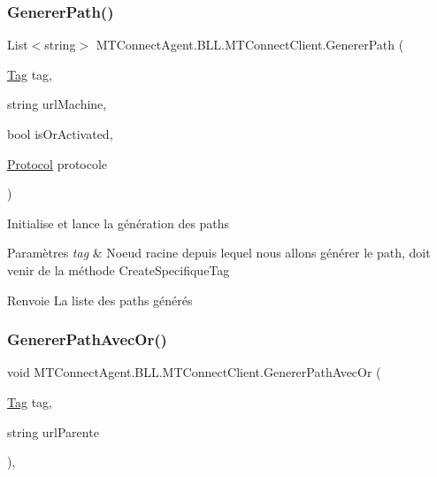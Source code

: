 \subsubsection{\texorpdfstring{Generer\+Path()}{GenererPath()}\hspace{0.1cm}{\footnotesize\ttfamily [2/2]}}
{\footnotesize\ttfamily List$<$string$>$ M\+T\+Connect\+Agent.\+B\+L\+L.\+M\+T\+Connect\+Client.\+Generer\+Path (\begin{DoxyParamCaption}\item[{\mbox{\hyperlink{class_m_t_connect_agent_1_1_model_1_1_tag}{Tag}}}]{tag,  }\item[{string}]{url\+Machine,  }\item[{bool}]{is\+Or\+Activated,  }\item[{\mbox{\hyperlink{class_m_t_connect_agent_1_1_b_l_l_1_1_m_t_connect_client_a2f390f74a0ad3ee5147e9438ceed6474}{Protocol}}}]{protocole }\end{DoxyParamCaption})\hspace{0.3cm}{\ttfamily [inline]}}



Initialise et lance la génération des paths 


\begin{DoxyParams}{Paramètres}
{\em tag} & Noeud racine depuis lequel nous allons générer le path, doit venir de la méthode Create\+Specifique\+Tag\\
\hline
\end{DoxyParams}
\begin{DoxyReturn}{Renvoie}
La liste des paths générés
\end{DoxyReturn}
\mbox{\label{class_m_t_connect_agent_1_1_b_l_l_1_1_m_t_connect_client_a7e6917938b6629de25db52ed84dba6c5}} 
\subsubsection{\texorpdfstring{Generer\+Path\+Avec\+Or()}{GenererPathAvecOr()}}
{\footnotesize\ttfamily void M\+T\+Connect\+Agent.\+B\+L\+L.\+M\+T\+Connect\+Client.\+Generer\+Path\+Avec\+Or (\begin{DoxyParamCaption}\item[{\mbox{\hyperlink{class_m_t_connect_agent_1_1_model_1_1_tag}{Tag}}}]{tag,  }\item[{string}]{url\+Parente }\end{DoxyParamCaption})\hspace{0.3cm}{\ttfamily [inline]}, {\ttfamily [private]}}



